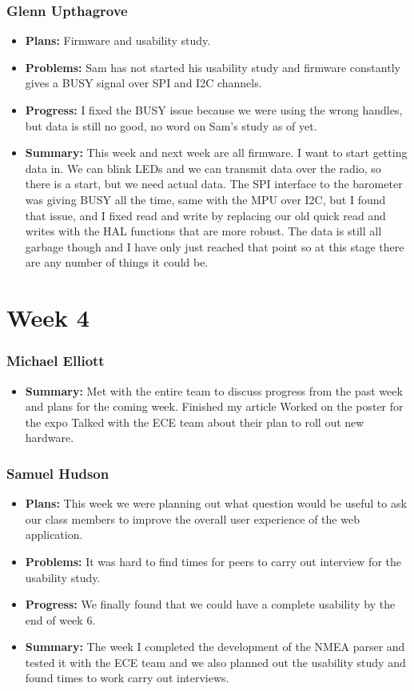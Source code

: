 \documentclass[onecolumn, draftclsnofoot,10pt, compsoc]{IEEEtran}
\begin{document}
\subsubsection{Glenn Upthagrove}
\begin {itemize}
 \item \textbf{Plans: }Firmware and usability study.  
 \item \textbf{Problems: }Sam has not started his usability study and firmware constantly gives a BUSY signal over SPI and I2C channels.  
 \item \textbf{Progress: }I fixed the BUSY issue because we were using the wrong handles, but data is still no good, no word on Sam's study as of yet.  
 \item \textbf{Summary: }This week and next week are all firmware. I want to start getting data in. We can blink LEDs and we can transmit data over the radio, so there is a start, but we need actual data. The SPI interface to the barometer was giving BUSY all the time, same with the MPU over I2C, but I found that issue, and I fixed read and write by replacing our old quick read and writes with the HAL functions that are more robust. The data is still all garbage though and I have only just reached that point so at this stage there are any number of things it could be.   
\end {itemize}

\section{Week 4}
\subsubsection{Michael Elliott}
\begin {itemize}
 \item \textbf{Summary: }Met with the entire team to discuss progress from the past week and
plans for the coming week.
Finished my article
Worked on the poster for the expo
Talked with the ECE team about their plan to roll out new hardware.
\end{itemize}
\subsubsection{Samuel Hudson}
\begin {itemize}
 \item \textbf{Plans: }This week we were planning out what question would be useful to ask our class members to improve the overall user experience of the web application. 
 \item \textbf{Problems: }It was hard to find times for peers to carry out interview for the usability study. 
 \item \textbf{Progress: }We finally found that we could have a complete usability by the end of week 6.
 \item \textbf{Summary: }The week I completed the development of the NMEA parser and tested it with the ECE team and we also planned out the usability study and found times to work carry out interviews.
\end {itemize}
\end{document}
